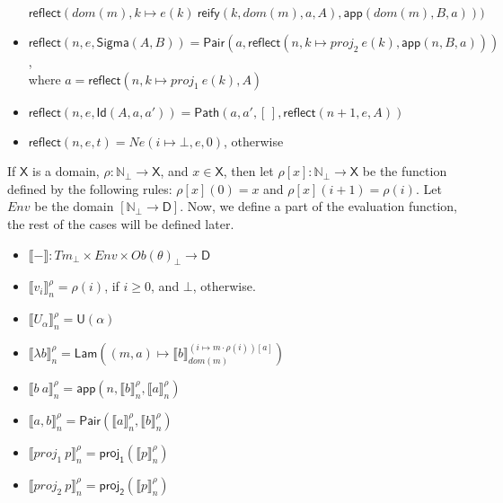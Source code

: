 \documentclass{amsart}
\theoremstyle{definition}
\theoremstyle{remark}
\newcommand{\D}{\mathsf{D}}
\newcommand{\nats}{\mathbb{N}}
\numberwithin{table}{section}
\begin{document}
\begin{itemize}
        \indent $\mathsf{reflect}(dom(m), k \mapsto e(k)\ \mathsf{reify}(k, dom(m), a, A), \mathsf{app}(dom(m), B, a)))$
\item[] $\mathsf{reflect}(n, e, \mathsf{Sigma}(A, B)) = \mathsf{Pair}(a, \mathsf{reflect}(n, k \mapsto proj_2\ e(k), \mathsf{app}(n, B, a)))$, \\
        \indent where $a = \mathsf{reflect}(n, k \mapsto proj_1\ e(k), A)$
\item[] $\mathsf{reflect}(n, e, \mathsf{Id}(A, a, a')) = \mathsf{Path}(a, a', [\,], \mathsf{reflect}(n + 1, e, A))$
\item[] $\mathsf{reflect}(n, e, t) = Ne(i \mapsto \bot, e, 0)$, otherwise
\end{itemize}

If $\mathsf{X}$ is a domain, $\rho : \nats_\bot \to \mathsf{X}$, and $x \in \mathsf{X}$,
then let $\rho[x] : \nats_\bot \to \mathsf{X}$ be the function defined by the following rules: $\rho[x](0) = x$ and $\rho[x](i+1) = \rho(i)$.
Let $Env$ be the domain $[\nats_\bot \to \D]$.
Now, we define a part of the evaluation function, the rest of the cases will be defined later.
\begin{itemize}
\item[] $\llbracket - \rrbracket : Tm_\bot \times Env \times Ob(\theta)_\bot \to \D$
\item[] $\llbracket v_i \rrbracket^\rho_n = \rho(i)$, if $i \geq 0$, and $\bot$, otherwise.
\item[] $\llbracket U_\alpha \rrbracket^\rho_n = \mathsf{U}(\alpha)$
\item[] $\llbracket \lambda b \rrbracket^\rho_n = \mathsf{Lam}((m, a) \mapsto \llbracket b \rrbracket^{(i \mapsto m \cdot \rho(i))[a]}_{dom(m)})$
\item[] $\llbracket b\ a \rrbracket^\rho_n = \mathsf{app}(n, \llbracket b \rrbracket^\rho_n, \llbracket a \rrbracket^\rho_n)$
\item[] $\llbracket a, b \rrbracket^\rho_n = \mathsf{Pair}(\llbracket a \rrbracket^\rho_n, \llbracket b \rrbracket^\rho_n)$
\item[] $\llbracket proj_1\ p \rrbracket^\rho_n = \mathsf{proj_1}(\llbracket p \rrbracket^\rho_n)$
\item[] $\llbracket proj_2\ p \rrbracket^\rho_n = \mathsf{proj_2}(\llbracket p \rrbracket^\rho_n)$
\end{itemize}
\end{document}

